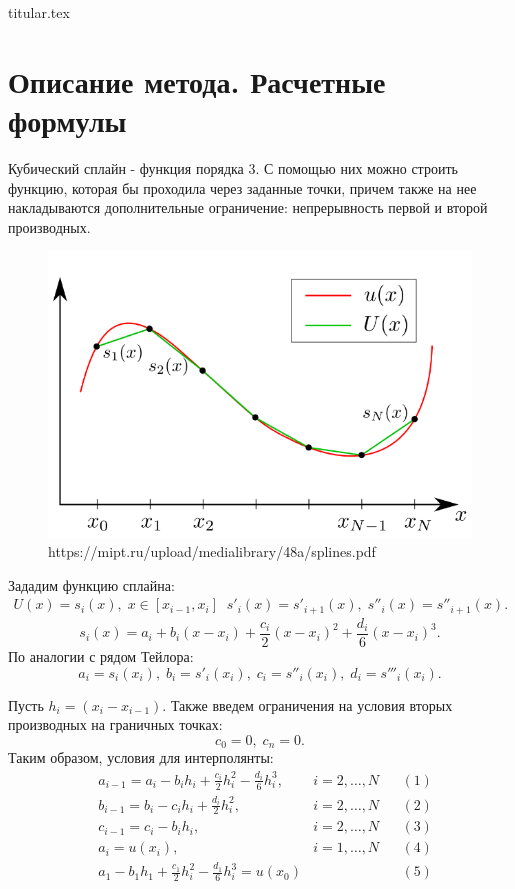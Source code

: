 \documentclass[11pt, a4paper]{article}
\begin{document}
{titular.tex}
\newpage

\section{Описание метода. Расчетные формулы}

Кубический сплайн - функция порядка 3. С помощью них можно строить функцию, которая бы проходила
через заданные точки, причем также на нее накладываются дополнительные ограничение: непрерывность
первой и второй производных.

\begin{figure}[h]
  \centering
  \includegraphics[width=0.5\linewidth]{spline.png}
  \caption{https://mipt.ru/upload/medialibrary/48a/splines.pdf}
\end{figure}

\medskip\noindent
Зададим функцию сплайна:
\begin{align*}
  U(x) = s_i(x), \; x \in [x_{i - 1}, x_i] \;\;
  s'_i(x) = s'_{i + 1}(x), \; s''_i(x) = s''_{i + 1}(x)
.\end{align*}
\[
s_i(x) = a_i + b_i (x - x_i) + \frac{c_i}{2} (x - x_i)^2 + \frac{d_i}{6} (x - x_i)^3
.\] 
\noindent
По аналогии с рядом Тейлора: \[
  a_i = s_i(x_i), \; b_i = s'_i(x_i), \; c_i = s''_i(x_i), \; d_i = s'''_i(x_i)
.\] 

\noindent
Пусть $h_i = (x_i - x_{i - 1})$.
Также введем ограничения на условия вторых производных на граничных точках: \[
  c_0 = 0, \; c_n = 0
.\] 
Таким образом, условия для интерполянты: 
\begin{align*}
& a_{i - 1} = a_i - b_i h_i + \frac{c_i}{2} h_i^2 - \frac{d_i}{6} h_i^3, & i =
  2,\dots,N& &(1) \\
& b_{i - 1} = b_i - c_i h_i + \frac{d_i}{2} h_i^2,  & i = 2,\dots,N & & (2) \\
& c_{i - 1} = c_i - b_i h_i,  & i=2,\dots,N & &(3)\\
& a_i = u(x_i), & i = 1,\dots,N & &(4) \\ 
& a_1 - b_1 h_1 + \frac{c_1}{2} h_i^2 - \frac{d_1}{6} h_i^3 = u(x_0)&\;& &(5)
\end{align*}
\end{document}
